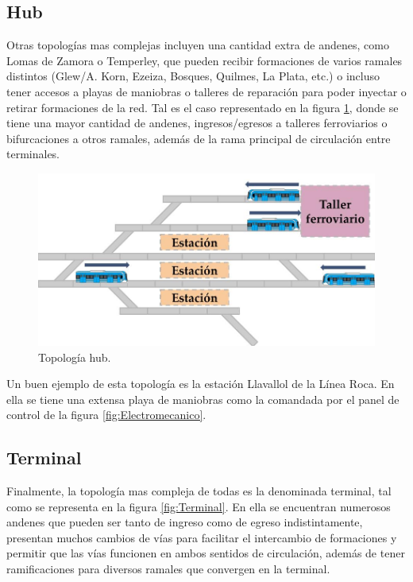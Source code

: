 	\subsection{Hub}
	
		Otras topologías mas complejas incluyen una cantidad extra de andenes, como Lomas de Zamora o Temperley, que pueden recibir formaciones de varios ramales distintos (Glew/A. Korn, Ezeiza, Bosques, Quilmes, La Plata, etc.) o incluso tener accesos a playas de maniobras o talleres de reparación para poder inyectar o retirar formaciones de la red. Tal es el caso representado en la figura \ref{fig:Hub}, donde se tiene una mayor cantidad de andenes, ingresos/egresos a talleres ferroviarios o bifurcaciones a otros ramales, además de la rama principal de circulación entre terminales. 
		
			\begin{figure}[h]
			\centering
				\includegraphics[scale=.44]{./Figures/Hub}
				\caption{Topología hub.}
				\label{fig:Hub}
			\end{figure}
	
		Un buen ejemplo de esta topología es la estación Llavallol de la Línea Roca. En ella se tiene una extensa playa de maniobras como la comandada por el panel de control de la figura \ref{fig:Electromecanico}.
		
	\subsection{Terminal}
		
		Finalmente, la topología mas compleja de todas es la denominada terminal, tal como se representa en la figura \ref{fig:Terminal}. En ella se encuentran numerosos andenes que pueden ser tanto de ingreso como de egreso indistintamente, presentan muchos cambios de vías para facilitar el intercambio de formaciones y permitir que las vías funcionen en ambos sentidos de circulación, además de tener ramificaciones para diversos ramales que convergen en la terminal.
		
